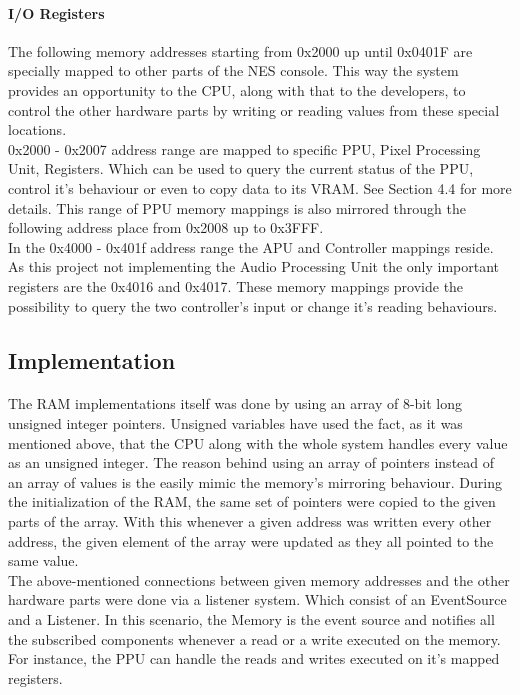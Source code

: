 \documentclass[]{report}
\begin{document}
 
\paragraph{I/O Registers}
The following memory addresses starting from 0x2000 up until 0x0401F are specially mapped to other parts of the NES console. This way the system provides an opportunity to the CPU, along with that to the developers, to control the other hardware parts by writing or reading values from these special locations.
\\
0x2000 - 0x2007 address range are mapped to specific PPU, Pixel Processing Unit, Registers. Which can be used to query the current status of the PPU, control it's behaviour or even to copy data to its VRAM. See Section 4.4 for more details.
This range of PPU memory mappings is also mirrored through the following address place from 0x2008 up to 0x3FFF.
\\
In the 0x4000 - 0x401f address range the APU and Controller mappings reside. As this project not implementing the Audio Processing Unit the only important registers are the 0x4016 and 0x4017. These memory mappings provide the possibility to query the two controller's input or change it's reading behaviours.


\subsection{Implementation}
\paragraph{ }
The RAM implementations itself was done by using an array of 8-bit long unsigned integer pointers. Unsigned variables have used the fact, as it was mentioned above, that the CPU along with the whole system handles every value as an unsigned integer. The reason behind using an array of pointers instead of an array of values is the easily mimic the memory's mirroring behaviour. During the initialization of the RAM, the same set of pointers were copied to the given parts of the array. With this whenever a given address was written every other address, the given element of the array were updated as they all pointed to the same value.
\\
The above-mentioned connections between given memory addresses and the other hardware parts were done via a listener system. Which consist of an EventSource and a Listener. In this scenario, the Memory is the event source and notifies all the subscribed components whenever a read or a write executed on the memory. For instance, the PPU can handle the reads and writes executed on it's mapped registers.
\end{document}

